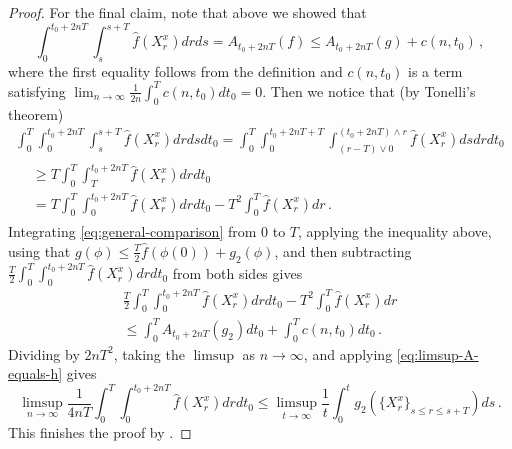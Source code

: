 \documentclass[final]{amsart}
\numberwithin{thm}{section}
\numberwithin{equation}{section}
\begin{document}
\begin{proof}
     For the final claim, note that above we showed that
     \begin{equation}\label{eq:general-comparison}
         \int_0^{t_0+2nT} \int_s^{s+T}\hat f(X_r^x)drds= A_{t_0 + 2nT}(f) \leq A_{t_0 + 2nT}(g) + c(n,t_0) \,,
     \end{equation}
     where the first equality follows from the definition and $c(n,t_0)$ is a term satisfying $\lim_{n \to \infty} \frac{1}{2n}\int_0^T c(n,t_0)dt_0 = 0$. Then we notice that (by Tonelli's theorem)
     \begin{multline*}
         \int_0^T\int_0^{t_0+2nT} \int_s^{s+T}\hat f(X_r^x)drdsdt_0 = \int_0^T\int_0^{t_0+2nT+T} \int_{(r-T)\vee0}^{(t_0 + 2nT) \wedge r}\hat f(X_r^x)dsdrdt_0 \\
    \begin{aligned}
         &\geq T\int_0^T\int_T^{t_0+2nT} \hat f(X_r^x)drdt_0 \\
         &= T\int_0^T\int_0^{t_0+2nT} \hat f(X_r^x)drdt_0 - T^2\int_0^T\hat f(X_r^x)dr \,.
     \end{aligned}
     \end{multline*}
     Integrating \eqref{eq:general-comparison} from $0$ to $T$, applying the inequality above, using that $g(\phi) \leq \frac{T}{2}\hat f(\phi(0)) + g_2(\phi)$, and then subtracting $\frac{T}{2}\int_0^T\int_0^{t_0+2nT} \hat f(X_r^x)drdt_0$ from both sides gives
     \begin{multline*}
     \frac{T}{2}\int_0^T\int_0^{t_0+2nT} \hat f(X_r^x)drdt_0 - T^2\int_0^T \hat f(X_r^x)dr\\
     \leq \int_0^TA_{t_0 + 2nT}(g_2)dt_0 + \int_0^T c(n,t_0)dt_0 \,.
     \end{multline*}
     Dividing by $2nT^2$, taking the $\limsup$ as $n \to \infty$, and applying \eqref{eq:limsup-A-equals-h} gives
     $$\limsup_{n \to \infty} \frac{1}{4nT} \int_0^T\int_0^{t_0+2nT} \hat f(X_r^x)drdt_0 \leq         \limsup_{t \to \infty} \frac{1}{t}\int_0^t g_2(\{X_r^x\}_{s\leq r \leq s+T})ds \,.$$
     This finishes the proof by .
\end{proof}
\end{document}
